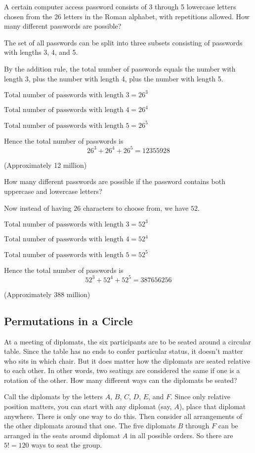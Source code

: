 \documentclass[11pt,a4paper]{book}
\begin{document}
\begin{example}

A certain computer access password consists of 3 through 5 lowercase
letters chosen from the 26 letters in the Roman alphabet, with repetitions
allowed. How many different passwords are possible?

The set of all passwords can be split into three subsets consisting
of passwords with lengths 3, 4, and 5.

By the addition rule, the total number of passwords equals the number
with length 3, plus the number with length 4, plus the number with
length 5.

$\text{Total number of passwords with length 3}=26^{3}$

$\text{Total number of passwords with length 4}=26^{4}$

$\text{Total number of passwords with length 5}=26^{5}$

Hence the total number of passwords is
\[
26^{3}+26^{4}+26^{5}=12355928
\]

(Approximately 12 million)

How many different passwords are possible if the password contains
both uppercase and lowercase letters?

Now instead of having $26$ characters to choose from, we have $52$.

$\text{Total number of passwords with length 3}=52^{3}$

$\text{Total number of passwords with length 4}=52^{4}$

$\text{Total number of passwords with length 5}=52^{5}$

Hence the total number of passwords is
\[
52^{3}+52^{4}+52^{5}=387656256
\]

(Approximately 388 million)

\end{example}

\subsection{Permutations in a Circle }

\begin{example}

At a meeting of diplomats, the six participants are to be seated around
a circular table. Since the table has no ends to confer particular
status, it doesn't matter who sits in which chair.
But it does matter how the diplomats are seated relative to each other.
In other words, two seatings are considered the same if one is a rotation of the other. How many different ways can the diplomats be seated?

\Solution

Call the diplomats by the letters $A$, $B$, $C$, $D$, $E$, and
$F$. Since only relative position matters, you can start with any
diplomat (say, $A$), place that diplomat anywhere. There is only
one way to do this. Then consider all arrangements of the other diplomats
around that one. The five diplomats $B$ through $F$ can be arranged
in the seats around diplomat $A$ in all possible orders. So there
are $5!=120$ ways to seat the group.

\end{example}
\end{document}
